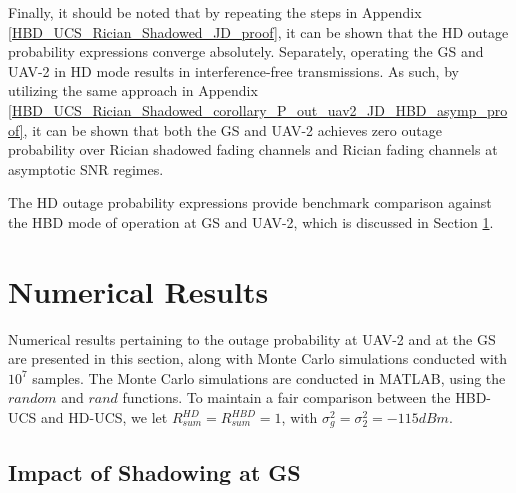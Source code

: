 Finally, it should be noted that by repeating the steps in Appendix \ref{HBD_UCS_Rician_Shadowed_JD_proof}, it can be shown that the HD outage probability expressions converge absolutely. Separately, operating the GS and UAV-2 in HD mode results in interference-free transmissions. As such, by utilizing the same approach in Appendix \ref{HBD_UCS_Rician_Shadowed_corollary_P_out_uav2_JD_HBD_asymp_proof}, it can be shown that both the GS and UAV-2 achieves zero outage probability over Rician shadowed fading channels and Rician fading channels at asymptotic SNR regimes. 

The HD outage probability expressions provide benchmark comparison against the HBD mode of operation at GS and UAV-2, which is discussed in Section \ref{HBD_UCS_Rician_Shadowed_sec_num_res}. 

\section{Numerical Results} \label{HBD_UCS_Rician_Shadowed_sec_num_res}

Numerical results pertaining to the outage probability at UAV-2 and at the GS are presented in this section, along with Monte Carlo simulations conducted with $10^{7}$ samples. The Monte Carlo simulations are conducted \textcolor{black}{in} MATLAB, using the $random$ and $rand$ functions. To maintain a fair comparison between the HBD-UCS and HD-UCS, we let $R_{sum}^{HD}=R_{sum}^{HBD}=1$, with $\sigma_g^2=\sigma_2^2=-115dBm$. 

\subsection{Impact of Shadowing at GS}


